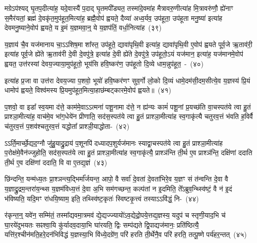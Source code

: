 मग्रे\-ऽप॑श्यद् घृ॒तप॒दीत्या॑ह॒ यदे॒वास्यै॑ प॒दाद् घृ॒तमपी᳚ड्यत॒ तस्मा॑दे॒वमा॑ह मैत्रावरु॒णीत्या॑ह मि॒त्रावरु॑णौ॒ ह्ये॑नाꣳ स॒मैर॑यतां॒ ब्रह्म॑ दे॒वकृ॑त॒मुप॑हूत॒मित्या॑ह॒ ब्रह्मै॒वोप॑ ह्वयते॒ दैव्या॑ अध्व॒र्यव॒ उप॑हूता॒ उप॑हूता मनु॒ष्या॑ इत्या॑ह देवमनु॒ष्याने॒वोप॑ ह्वयते॒ य इ॒मं य॒ज्ञमवा॒न्॒ ये य॒ज्ञप॑तिं॒ वर्धा॒नित्या॑ह~(३९)

य॒ज्ञाय॑ चै॒व यज॑मानाय चा॒\-ऽऽ\-शिष॒मा शा᳚स्त॒ उप॑हूते॒ द्यावा॑पृथि॒वी इत्या॑ह॒ द्यावा॑पृथि॒वी ए॒वोप॑ ह्वयते पूर्व॒जे ऋ॒ताव॑री॒ इत्या॑ह पूर्व॒जे ह्ये॑ते ऋ॒ताव॑री दे॒वी दे॒वपु॑त्रे॒ इत्या॑ह दे॒वी ह्ये॑ते दे॒वपु॑त्रे॒ उप॑हूतो॒\-ऽयं यज॑मान॒ इत्या॑ह॒ यज॑मानमे॒वोप॑ ह्वयत॒ उत्त॑रस्यां देवय॒ज्याया॒मुप॑हूतो॒ भूय॑सि हवि॒ष्कर॑ण॒ उप॑हूतो दि॒व्ये धाम॒न्नुप॑हूत॒~-~(४०)

इत्या॑ह प्र॒जा वा उत्त॑रा देवय॒ज्या प॒शवो॒ भूयो॑ हवि॒ष्कर॑णꣳ सुव॒र्गो लो॒को दि॒व्यं धामे॒दम॑सी॒दम॒सीत्ये॒व य॒ज्ञस्य॑ प्रि॒यं धामोप॑ ह्वयते॒ विश्व॑मस्य प्रि॒यमुप॑हूत॒मित्या॒हाछ॑म्बट्कारमे॒वोप॑ ह्वयते॥~(४१)

{\anuvakamend[{आ॒ह॒ धे॒नुरे॒तां वर्धा॒नित्या॑ह॒ धाम॒न्नुप॑हूत॒श्चतु॑स्त्रिꣳशच्च}]}%

प॒शवो॒ वा इडा᳚ स्व॒यमा द॑त्ते॒ काम॑मे॒वा\-ऽऽ\-त्मना॑ पशू॒नामा द॑त्ते॒ न ह्य॑न्यः कामं॑ पशू॒नां प्र॒यच्छ॑ति वा॒चस्पत॑ये त्वा हु॒तं प्राश्ञा॒मीत्या॑ह॒ वाच॑मे॒व भा॑ग॒धेये॑न प्रीणाति॒ सद॑स॒स्पत॑ये त्वा हु॒तं प्राश्ञा॒मीत्या॑ह स्व॒गाकृ॑त्यै चतुरव॒त्तं भ॑वति ह॒विर्वै च॑तुरव॒त्तं प॒शव॑श्चतुरव॒त्तं यद्धोता᳚ प्राश्ञी॒याद्धोता-~(४२)

ऽ\-ऽर्ति॒मार्च्छे॒द्यद॒ग्नौ जु॑हु॒याद्रु॒द्राय॑ प॒शूनपि॑ दध्यादप॒शुर्यज॑मानः स्याद्वा॒चस्पत॑ये त्वा हु॒तं प्राश्ञा॒मीत्या॑ह प॒रोक्ष॑मे॒वैन॑ज्जुहोति॒ सद॑स॒स्पत॑ये त्वा हु॒तं प्राश्ञा॒मीत्या॑ह स्व॒गाकृ॑त्यै॒ प्राश्ञ॑न्ति ती॒र्थ ए॒व प्राश्ञ॑न्ति॒ दक्षि॑णां ददाति ती॒र्थ ए॒व दक्षि॑णां ददाति॒ वि वा ए॒तद्य॒ज्ञं~(४३)

छि॑न्दन्ति॒ यन्म॑ध्य॒तः प्रा॒श्ञन्त्य॒द्भिर्मा᳚र्जयन्त॒ आपो॒ वै सर्वा॑ दे॒वता॑ दे॒वता॑भिरे॒व य॒ज्ञꣳ सं त॑न्वन्ति दे॒वा वै य॒ज्ञाद्रु॒द्रम॒न्तरा॑य॒न्थ्स य॒ज्ञम॑विध्य॒त्तं दे॒वा अ॒भि सम॑गच्छन्त॒ कल्प॑तां न इ॒दमिति॒ ते᳚\-ऽब्रुव॒न्थ्स्वि॑ष्टं॒ वै न॑ इ॒दं भ॑विष्यति॒ यदि॒मꣳ रा॑धयि॒ष्याम॒ इति॒ तथ्स्वि॑ष्ट॒कृतः॑ स्विष्टकृ॒त्त्वं तस्या\-ऽऽ\-वि॑द्धं॒ नि-~(४४)

र॑कृन्त॒न्॒ यवे॑न॒ सम्मि॑तं॒ तस्मा᳚द्यवमा॒त्रमव॑ द्ये॒द्यज्ज्यायो॑\-ऽव॒द्येद्रो॒पये॒त्तद्य॒ज्ञस्य॒ यदुप॑ च स्तृणी॒याद॒भि च॑ घा॒रये॑दुभयतः सꣴश्वा॒यि कु॑र्यादव॒दाया॒भि घा॑रयति॒ द्विः सम्प॑द्यते द्वि॒पाद्यज॑मानः॒ प्रति॑ष्ठित्यै॒ यत्ति॑र॒श्चीन॑मति॒हरे॒दन॑भिविद्धं य॒ज्ञस्या॒भि वि॑ध्ये॒दग्रे॑ण॒ परि॑ हरति ती॒र्थेनै॒व परि॑ हरति॒ तत्पू॒ष्णे पर्य॑हर॒न्तत्~(४५)

